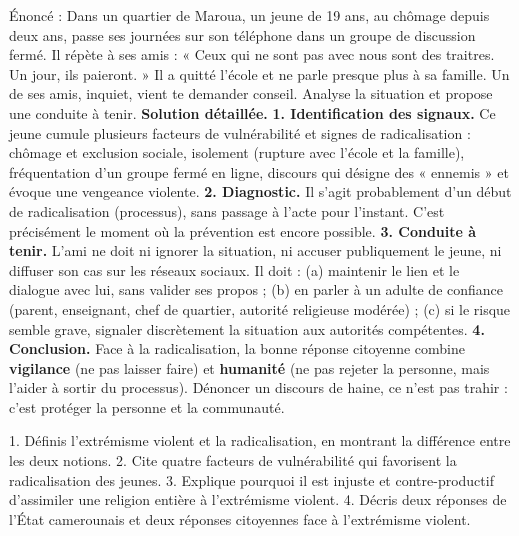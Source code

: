 \documentclass[11pt]{article}
\newcommand{\cle}[1]{{\popxbold\color{popdark}#1}}
\begin{document}
\begin{exoresolu}
Énoncé : Dans un quartier de Maroua, un jeune de 19 ans, au chômage depuis deux ans, passe ses journées sur son téléphone dans un groupe de discussion fermé. Il répète à ses amis : « Ceux qui ne sont pas avec nous sont des traitres. Un jour, ils paieront. » Il a quitté l'école et ne parle presque plus à sa famille. Un de ses amis, inquiet, vient te demander conseil. Analyse la situation et propose une conduite à tenir.
\tcblower
\textbf{Solution détaillée.}
\textbf{1. Identification des signaux.} Ce jeune cumule plusieurs facteurs de vulnérabilité et signes de radicalisation : chômage et exclusion sociale, isolement (rupture avec l'école et la famille), fréquentation d'un groupe fermé en ligne, discours qui désigne des « ennemis » et évoque une vengeance violente.
\textbf{2. Diagnostic.} Il s'agit probablement d'un début de \cle{radicalisation} (processus), sans passage à l'acte pour l'instant. C'est précisément le moment où la prévention est encore possible.
\textbf{3. Conduite à tenir.} L'ami ne doit ni ignorer la situation, ni accuser publiquement le jeune, ni diffuser son cas sur les réseaux sociaux. Il doit : (a) maintenir le lien et le dialogue avec lui, sans valider ses propos ; (b) en parler à un adulte de confiance (parent, enseignant, chef de quartier, autorité religieuse modérée) ; (c) si le risque semble grave, signaler discrètement la situation aux autorités compétentes.
\textbf{4. Conclusion.} Face à la radicalisation, la bonne réponse citoyenne combine \textbf{vigilance} (ne pas laisser faire) et \textbf{humanité} (ne pas rejeter la personne, mais l'aider à sortir du processus). Dénoncer un discours de haine, ce n'est pas trahir : c'est protéger la personne et la communauté.
\end{exoresolu}

\begin{exercice}
1. Définis l'extrémisme violent et la radicalisation, en montrant la différence entre les deux notions.
2. Cite quatre facteurs de vulnérabilité qui favorisent la radicalisation des jeunes.
3. Explique pourquoi il est injuste et contre-productif d'assimiler une religion entière à l'extrémisme violent.
4. Décris deux réponses de l'État camerounais et deux réponses citoyennes face à l'extrémisme violent.
\end{exercice}
\end{document}
